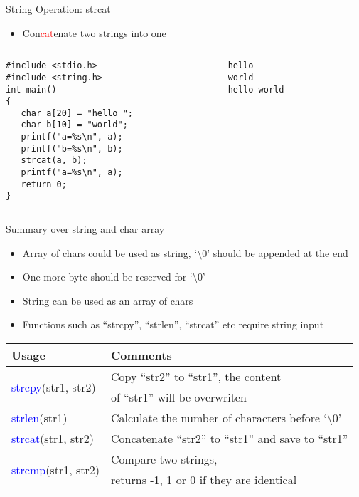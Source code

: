 \begin{frame}[fragile]{String Operation: strcat}
\begin{itemize}
	\item {Con\textcolor{red}{cat}enate two strings into one}
\end{itemize}
\begin{columns}
\begin{column}{0.45\linewidth}
\begin{lstlisting}
#include <stdio.h>
#include <string.h>
int main()
{
   char a[20] = "hello ";
   char b[10] = "world";
   printf("a=%s\n", a);
   printf("b=%s\n", b);
   strcat(a, b);
   printf("a=%s\n", a);
   return 0;
}
\end{lstlisting}
\end{column}
\begin{column}{0.45\linewidth}
\begin{lstlisting}
hello
world
hello world
\end{lstlisting}
\end{column}
\end{columns}
\end{frame}

\begin{frame}[fragile]{Summary over string and char array}
\begin{itemize}
	\item {Array of chars could be used as string, `$\setminus$0' should be appended at the end}
	\item {One more byte should be reserved for `$\setminus$0'}
	\item {String can be used as an array of chars}
	\item {Functions such as ``strcpy'', ``strlen'', ``strcat'' etc require string input}
\end{itemize}

\begin{table}
\begin{center}
	\begin{tabular}{|l|l|} \hline
	 Usage & Comments \\ \hline
	\multirow{2}{*}{\textcolor{blue}{strcpy}(str1, str2)} & Copy ``str2'' to ``str1'', the content \\ & of ``str1'' will be overwriten \\ \hline
	 \textcolor{blue}{strlen}(str1) & Calculate the number of characters before `$\setminus$0' \\ \hline
	\textcolor{blue}{strcat}(str1, str2) & Concatenate ``str2'' to ``str1'' and save to ``str1'' \\ \hline
	\multirow{2}{*}{\textcolor{blue}{strcmp}(str1, str2)} & Compare two strings, \\ & returns -1, 1 or 0 if they are identical \\ \hline
	\end{tabular}
\end{center}
\end{table}

\end{frame}